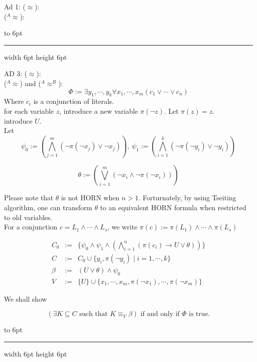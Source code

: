 \documentclass[12pt]{article}
\newcommand{\AEQB}{\mbox{$^A$\hspace{-0.5mm}$\approx^B$}}
\newcommand{\AEQ}{\mbox{$^A$\hspace{-0.5mm}$\approx$}}
\newenvironment{proof}{\parindent=0pt{\bf Proof: }}{
   \hspace*{\fill}\hbox to 6pt{\leaders\hrule width 6pt height 6pt\hfill}\par}
\begin{document}
\begin{proof}
Ad 1: ($\approx$):\\

(\AEQ):





\end{proof}
\begin{proof}
AD 3: ($\approx$):\\
(\AEQ) and (\AEQB):\\
$$\Phi:=\exists y_1,\cdots, y_k \forall x_1,\cdots, x_m \left(c_1\vee\cdots\vee c_n \right)$$
%
Where $c_i$ is a conjunction of literals.\\

for each variable $z$, introduce a new variable $\pi(\neg z)$. Let $\pi(z)=z$.\\

introduce $U$.\\

Let $$\psi_0:=\left(\bigwedge_{j=1}^m (\neg \pi(\neg x_j)\vee \neg x_j)\right), \ \psi_1:= \left(\bigwedge_{i=1}^k(\neg \pi(\neg y_i)\vee \neg y_i)\right)$$

$$\theta:=\left(\bigvee_{i=1}^m (\neg x_i\wedge \neg\pi(\neg x_i))\right)$$


Please note that $\theta$ is not HORN  when $n>1$. Forturnately, by using Tseiting algorithm, one can transform  $\theta$ to an equivalent HORN formula when restricted to old variables. \\



For a conjunction $c=L_1\wedge\cdots\wedge L_s$, we write
$\pi(c):=\pi(L_1)\wedge\cdots\wedge \pi(L_s)$


$$\begin{array}{lcl}C_0&:=&\{\psi_0\wedge\psi_1 \wedge\left( \bigwedge_{i=1}^n(\pi(c_i)\rightarrow U\vee \theta)\right)\}\\

C&:=&C_0\cup \{y_i,\pi(\neg y_i)\mid i=1,\cdots,k\}\\
\beta&:= &(U\vee\theta)\wedge \psi_0 \\
V&:=&\{U\}\cup\{x_1,\cdots,x_m,\pi(\neg x_1),\cdots, \pi(\neg x_m)\}
\end{array}$$

We shall show

$$(\exists K\subseteq C \text{ such that } K\equiv_V \beta) \text{ if and only if $\Phi$ is true}.$$


\end{proof}
\end{document}
